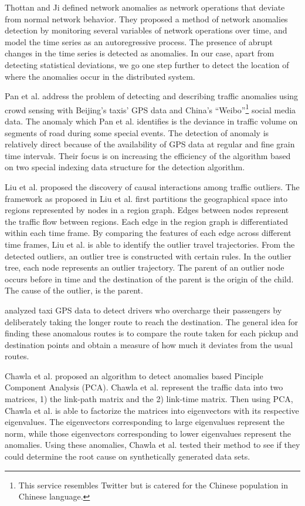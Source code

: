 \documentclass[conference]{IEEEtran.1.8}
\begin{document}
Thottan and Ji \cite{Thottan2003} defined network anomalies as network operations that deviate from normal network behavior. They proposed a method of network anomalies detection by monitoring several variables of network operations over time, and model the time series as an autoregressive process. The presence of abrupt changes in the time series is detected as anomalies. In our case, apart from detecting statistical deviations, we go one step further to detect the location of where the anomalies occur in the distributed system.

Pan et al. \cite{Pan2013} address the problem of detecting and describing traffic anomalies using crowd sensing with Beijing's taxis' GPS data and China's ``Weibo''\footnote{This service resembles Twitter but is catered for the Chinese population in Chinese language.} social media data. The anomaly which Pan et al. \cite{Pan2013} identifies is the deviance in traffic volume on segments of road during some special events. The detection of anomaly is relatively direct because of the availability of GPS data at regular and fine grain time intervals. Their focus is on increasing the efficiency of the algorithm based on two special indexing data structure for the detection algorithm. 

Liu et al. \cite{Liu2011} proposed the discovery of causal interactions among traffic outliers. The framework as proposed in Liu et al.\cite{Liu2011} first partitions the geographical space into regions represented by nodes in a region graph. Edges between nodes represent the traffic flow between regions. Each edge in the region graph is differentiated within each time frame. By comparing the features of each edge across different time frames, Liu et al. is able to identify the outlier travel trajectories. From the detected outliers, an outlier tree is constructed with certain rules. In the outlier tree, each node represents an outlier trajectory. The parent of an outlier node occurs before in time and the destination of the parent is the origin of the child. The cause of the outlier, is the parent.

\cite{Ge2011,Zhang2011,Zhang2012} analyzed taxi GPS data to detect drivers who overcharge their passengers by deliberately taking the longer route to reach the destination. The general idea for finding these anomalous routes is to compare the route taken for each pickup and destination points and obtain a measure of how much it deviates from the usual routes.

Chawla et al. \cite{Chawla2012} proposed an algorithm to detect anomalies based Pinciple Component Analysis (PCA). Chawla et al. \cite{Chawla2012} represent the traffic data into two matrices, 1) the link-path matrix and the 2) link-time matrix. Then using PCA, Chawla et al. \cite{Chawla2012} is able to factorize the matrices into eigenvectors with its respective eigenvalues. The eigenvectors corresponding to large eigenvalues represent the norm, while those eigenvectors corresponding to lower eigenvalues represent the anomalies. Using these anomalies, Chawla et al. \cite{Chawla2012} tested their method to see if they could determine the root cause on synthetically generated data sets.
\end{document}
